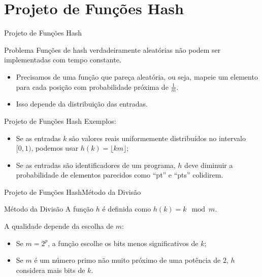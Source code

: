\documentclass[aspectratio=169]{beamer}
\begin{document}
\section{Projeto de Funções Hash}


\begin{frame}{Projeto de Funções Hash}
\begin{block}{Problema}
Funções de hash verdadeiramente aleatórias não podem ser implementadas com tempo constante.
\end{block}
\begin{itemize}
\item Precisamos de uma função que pareça aleatória, ou seja, mapeie um elemento para cada posição com probabilidade próxima de $\frac{1}{m}$. \item Isso depende da distribuição das entradas.
\end{itemize}
\end{frame}

\begin{frame}{Projeto de Funções Hash}
Exemplos:
\begin{itemize}
 \item Se as entradas $k$ são valores reais uniformemente distribuídos no intervalo $[0, 1)$, podemos usar $h(k) = \lfloor km \rfloor$;
 \item Se as entradas são identificadores de um programa, $h$ deve diminuir a probabilidade de elementos parecidos como ``pt'' e ``pts'' colidirem.
\end{itemize}
\end{frame}


\begin{frame}{Projeto de Funções Hash}{Método da Divisão}
\begin{block}{Método da Divisão}
A função $h$ é definida como $h(k) = k \mod m$.
\end{block}
A qualidade depende da escolha de $m$:
 \begin{itemize}
 \item Se $m = 2^p$, a função escolhe os bits menos significativos de $k$;
 \item Se $m$ é um número primo não muito próximo de uma potência de $2$, $h$ considera mais bits de $k$.
 \end{itemize}
\end{frame}
\end{document}
